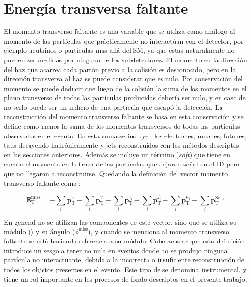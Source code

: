 \section{Energía transversa faltante}\label{sec:met}


El momento transverso faltante es una variable que se utiliza como análogo al momento de las partículas que prácticamente no interactúan con el detector, por ejemplo neutrinos o partículas más allá del SM, ya que estas naturalmente no pueden ser medidas por ninguno de los subdetectores. El momento en la dirección del haz que acarrea cada partón previo a la colisión es desconocido, pero en la dirección transversa al haz se puede considerar que es nulo. Por conservación del momento se puede deducir que luego de la colisión la suma de los momentos en el plano transverso de todas las partículas producidas debería ser nulo, y en caso de no serlo puede ser un indicio de una partícula que escapó la detección. La reconstrucción del momento transverso faltante se basa en esta conservación y se define como menos la suma de los momentos transversos de todas las partículas observadas en el evento. En esta suma se incluyen los electrones, muones, fotones, taus decayendo hadrónicamente y jets reconstruidos con los métodos descriptos en las secciones anteriores. Además se incluye un término (\textit{soft}) que tiene en cuenta el momento en la traza de las partículas que dejaron señal en el ID pero que no llegaron a reconstruirse. Quedando la definición del vector momento transverso faltante como \cite{PERF-2016-07}:

\begin{equation}
\textbf{E}_{\text{T}}^{\text{miss}} = -\sum_{i}\textbf{p}_{\text{T}}^{e_i}-\sum_{i}\textbf{p}_{\text{T}}^{\gamma_i}-\sum_{i}\textbf{p}_{\text{T}}^{\tau_i}-\sum_{i}\textbf{p}_{\text{T}}^{j_i}-\sum_{i}\textbf{p}_{\text{T}}^{\mu_i}-\sum_{i}\textbf{p}_{\text{T}}^{\text{Soft}_i}
\end{equation}


En general no se utilizan las componentes de este vector, sino que se utiliza su módulo (\met) y su ángulo ($\phi^{\text{miss}}$), y cuando se menciona al momento transverso faltante se está haciendo referencia a su módulo. Cabe aclarar que esta definición introduce un sesgo a tener \met no nula en eventos donde no se produjo ninguna partícula no interactuante, debido a la incorrecta o insuficiente reconstrucción de todos los objetos presentes en el evento. Este tipo de \met se denomina instrumental, y tiene un rol importante en los procesos de fondo descriptos en el presente trabajo.

